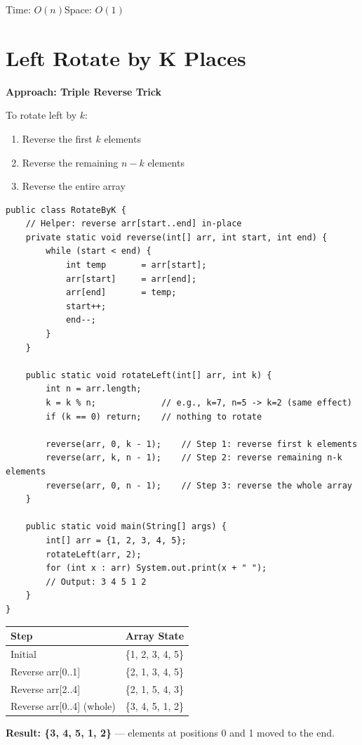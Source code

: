 \documentclass[12pt,a4paper,oneside]{book}
\begin{document}
\begin{complexity}
Time: $O(n)$\quad Space: $O(1)$
\end{complexity}

\section{Left Rotate by K Places}

\textbf{Approach: Triple Reverse Trick}

To rotate left by $k$:
\begin{enumerate}
  \item Reverse the first $k$ elements
  \item Reverse the remaining $n-k$ elements
  \item Reverse the entire array
\end{enumerate}

\begin{lstlisting}[caption={Left Rotate by K --- Triple Reverse, O(n) time O(1) space}]
public class RotateByK {
    // Helper: reverse arr[start..end] in-place
    private static void reverse(int[] arr, int start, int end) {
        while (start < end) {
            int temp       = arr[start];
            arr[start]     = arr[end];
            arr[end]       = temp;
            start++;
            end--;
        }
    }

    public static void rotateLeft(int[] arr, int k) {
        int n = arr.length;
        k = k % n;             // e.g., k=7, n=5 -> k=2 (same effect)
        if (k == 0) return;    // nothing to rotate

        reverse(arr, 0, k - 1);    // Step 1: reverse first k elements
        reverse(arr, k, n - 1);    // Step 2: reverse remaining n-k elements
        reverse(arr, 0, n - 1);    // Step 3: reverse the whole array
    }

    public static void main(String[] args) {
        int[] arr = {1, 2, 3, 4, 5};
        rotateLeft(arr, 2);
        for (int x : arr) System.out.print(x + " ");
        // Output: 3 4 5 1 2
    }
}
\end{lstlisting}

\begin{dryrun}[Dry Run: arr = \{1, 2, 3, 4, 5\}, k = 2]
\begin{center}
\begin{tabular}{ll}
\toprule
\textbf{Step} & \textbf{Array State}\\
\midrule
Initial                       & \{1, 2, 3, 4, 5\}\\
Reverse arr[0..1]             & \{2, 1, 3, 4, 5\}\\
Reverse arr[2..4]             & \{2, 1, 5, 4, 3\}\\
Reverse arr[0..4] (whole)     & \{3, 4, 5, 1, 2\}\\
\bottomrule
\end{tabular}
\end{center}
\textbf{Result: \{3, 4, 5, 1, 2\}} --- elements at positions 0 and 1 moved to the end.
\end{dryrun}
\end{document}
